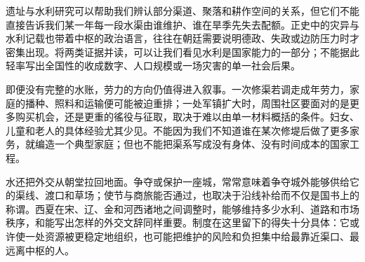 遗址与水利研究可以帮助我们辨认部分渠道、聚落和耕作空间的关系，但它们不能直接告诉我们某一年每一段水渠由谁维护、谁在旱季先失去配额。正史中的灾异与水利记载也带着中枢的政治语言，往往在朝廷需要说明德政、失政或边防压力时才密集出现。将两类证据并读，可以让我们看见水利是国家能力的一部分；不能据此轻率写出全国性的收成数字、人口规模或一场灾害的单一社会后果。

即便没有完整的水账，劳力的方向仍值得进入叙事。一次修渠若调走成年劳力，家庭的播种、照料和运输便可能被迫重排；一处军镇扩大时，周围社区要面对的是更多购买机会，还是更重的徭役与征取，取决于难以由单一材料概括的条件。妇女、儿童和老人的具体经验尤其少见。不能因为我们不知道谁在某次修堤后做了更多家务，就编造一个典型家庭；但也不能把渠系写成没有身体、没有时间成本的国家工程。

水还把外交从朝堂拉回地面。争夺或保护一座城，常常意味着争夺城外能够供给它的渠线、渡口和草场；使节与商旅能否通过，也取决于沿线补给而不仅是国书上的称谓。西夏在宋、辽、金和河西诸地之间调整时，能够维持多少水利、道路和市场秩序，和能写出怎样的外交文辞同样重要。制度在这里留下的得失十分具体：它或许使一处资源被更稳定地组织，也可能把维护的风险和负担集中给最靠近渠口、最远离中枢的人。
